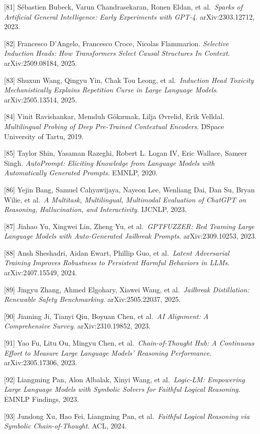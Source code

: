 {[}81{]} Sébastien Bubeck, Varun Chandrasekaran, Ronen Eldan, et al.~\emph{Sparks of Artificial General Intelligence: Early Experiments with GPT-4}. arXiv:2303.12712, 2023.

{[}82{]} Francesco D'Angelo, Francesco Croce, Nicolas Flammarion. \emph{Selective Induction Heads: How Transformers Select Causal Structures In Context}. arXiv:2509.08184, 2025.

{[}83{]} Shuxun Wang, Qingyu Yin, Chak Tou Leong, et al.~\emph{Induction Head Toxicity Mechanistically Explains Repetition Curse in Large Language Models}. arXiv:2505.13514, 2025.

{[}84{]} Vinit Ravishankar, Memduh Gökırmak, Lilja Øvrelid, Erik Velldal. \emph{Multilingual Probing of Deep Pre-Trained Contextual Encoders}. DSpace University of Tartu, 2019.

{[}85{]} Taylor Shin, Yasaman Razeghi, Robert L. Logan IV, Eric Wallace, Sameer Singh. \emph{AutoPrompt: Eliciting Knowledge from Language Models with Automatically Generated Prompts}. EMNLP, 2020.

{[}86{]} Yejin Bang, Samuel Cahyawijaya, Nayeon Lee, Wenliang Dai, Dan Su, Bryan Wilie, et al.~\emph{A Multitask, Multilingual, Multimodal Evaluation of ChatGPT on Reasoning, Hallucination, and Interactivity}. IJCNLP, 2023.

{[}87{]} Jiahao Yu, Xingwei Lin, Zheng Yu, et al.~\emph{GPTFUZZER: Red Teaming Large Language Models with Auto-Generated Jailbreak Prompts}. arXiv:2309.10253, 2023.

{[}88{]} Ansh Sheshadri, Aidan Ewart, Phillip Guo, et al.~\emph{Latent Adversarial Training Improves Robustness to Persistent Harmful Behaviors in LLMs}. arXiv:2407.15549, 2024.

{[}89{]} Jingyu Zhang, Ahmed Elgohary, Xiawei Wang, et al.~\emph{Jailbreak Distillation: Renewable Safety Benchmarking}. arXiv:2505.22037, 2025.

{[}90{]} Jiaming Ji, Tianyi Qiu, Boyuan Chen, et al.~\emph{AI Alignment: A Comprehensive Survey}. arXiv:2310.19852, 2023.

{[}91{]} Yao Fu, Litu Ou, Mingyu Chen, et al.~\emph{Chain-of-Thought Hub: A Continuous Effort to Measure Large Language Models' Reasoning Performance}. arXiv:2305.17306, 2023.

{[}92{]} Liangming Pan, Alon Albalak, Xinyi Wang, et al.~\emph{Logic-LM: Empowering Large Language Models with Symbolic Solvers for Faithful Logical Reasoning}. EMNLP Findings, 2023.

{[}93{]} Jundong Xu, Hao Fei, Liangming Pan, et al.~\emph{Faithful Logical Reasoning via Symbolic Chain-of-Thought}. ACL, 2024.

